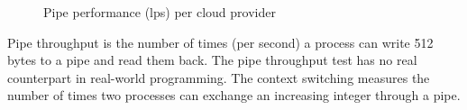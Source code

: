 \documentclass[11pt]{article}
\begin{document}
\begin{figure}[!h]
    \captionsetup[subfigure]{labelformat=empty}
    \centering
    \subfloat[]{}

    \vspace{-5mm}
    \vspace{-3mm}
    \caption{Pipe performance (lps) per cloud provider}
    \label{fig:bench_pipe}
\end{figure}

Pipe throughput is the number of times (per second) a process can write 512 bytes to a pipe and read them back. The pipe throughput test has no real counterpart in real-world programming. The context switching measures the number of times two processes can exchange an increasing integer through a pipe. 
\end{document}
